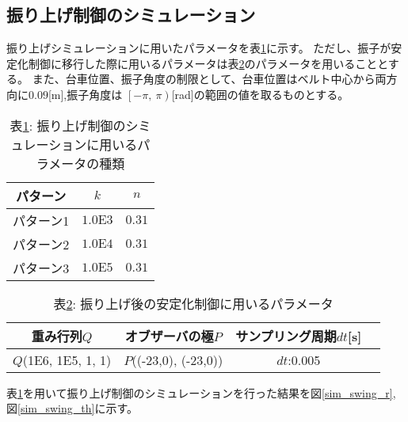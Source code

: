 \subsection{振り上げ制御のシミュレーション}
振り上げシミュレーションに用いたパラメータを表\ref{sim_swing}に示す。
ただし、振子が安定化制御に移行した際に用いるパラメータは表\ref{swing_stable}のパラメータを用いることとする。
また、台車位置、振子角度の制限として、台車位置はベルト中心から両方向に$0.09$[m],振子角度は
$\left[-\pi\right.,\ \left.\pi\right)$[rad]の範囲の値を取るものとする。

\begin{table}[htbp]
    \begin{center}
        \caption{表\ref{sim_swing}: 振り上げ制御のシミュレーションに用いるパラメータの種類}
        \begin{tabular}{|c|c|c|} \hline
            パターン & $k$ & $n$ \\ \hline \hline
            パターン1 & $1.0\mbox{E}3$ & $0.31$ \\ \hline
            パターン2 & $1.0\mbox{E}4$ & $0.31$ \\ \hline
            パターン3 & $1.0\mbox{E}5$ & $0.31$ \\ \hline
        \end{tabular}
        \label{sim_swing}
    \end{center}
\end{table}

\begin{table}[htbp]
    \begin{center}
        \caption{表\ref{swing_stable}: 振り上げ後の安定化制御に用いるパラメータ}
        \begin{tabular}{|c|c|c|c|} \hline
            重み行列$Q$ & オブザーバの極$P$ & サンプリング周期$dt$[s] \\ \hline \hline
            $Q$(1E6, 1E5, 1, 1) & $P$((-23,0), (-23,0)) & $dt$:0.005 \\ \hline
          \end{tabular}
        \label{swing_stable}
    \end{center}
\end{table}

表\ref{sim_swing}を用いて振り上げ制御のシミュレーションを行った結果を図\ref{sim_swing_r},
図\ref{sim_swing_th}に示す。

